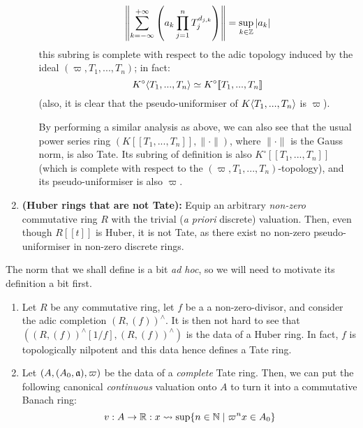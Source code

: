 \begin{example}
\begin{enumerate}
\begin{itemize}
                                    $$\left\|\sum_{k = -\infty}^{+\infty} \left(a_k \prod_{j = 1}^n T_j^{d_{j, k}}\right)\right\| = \sup_{k \in \mathbb{Z}} |a_k|$$
                                this subring is complete with respect to the adic topology induced by the ideal $(\varpi, T_1, ..., T_n)$; in fact:
                                    $$K^{\circ}\langle T_1, ..., T_n\rangle \simeq K^{\circ}[\![T_1, ..., T_n]\!]$$
                                (also, it is clear that the pseudo-uniformiser of $K\langle T_1, ..., T_n\rangle$ is $\varpi$).
                                
                                By performing a similar analysis as above, we can also see that the usual power series ring $(K[\![T_1, ..., T_n]\!], \|\cdot\|)$, where $\|\cdot\|$ is the Gauss norm, is also Tate. Its subring of definition is also $K^{\circ}[\![T_1, ..., T_n]\!]$ (which is complete with respect to the $(\varpi, T_1, ..., T_n)$-topology), and its pseudo-uniformiser is also $\varpi$.         
                            \end{itemize}
                        \item \textbf{(Huber rings that are not Tate):} Equip an arbitrary \textit{non-zero} commutative ring $R$ with the trivial (\textit{a priori} discrete) valuation. Then, even though $R[\![t]\!]$ is Huber, it is not Tate, as there exist no non-zero pseudo-uniformiser in non-zero discrete rings.  
                    \end{enumerate}
                \end{example}
                \begin{remark} \label{remark: canonical_norm_for_tate_rings}
                    The norm that we shall define is a bit \textit{ad hoc}, so we will need to motivate its definition a bit first.
                    \begin{enumerate}
                        \item Let $R$ be any commutative ring, let $f$ be a a non-zero-divisor, and consider the adic completion $(R, (f))^{\wedge}$. It is then not hard to see that $\left((R, (f))^{\wedge}[1/f], (R, (f))^{\wedge}\right)$ is the data of a Huber ring. In fact, $f$ is topologically nilpotent and this data hence defines a Tate ring. 
                        \item Let $(A, (A_0, \mathfrak{a}), \varpi)$ be the data of a \textit{complete} Tate ring. Then, we can put the following canonical \textit{continuous} valuation onto $A$ to turn it into a commutative Banach ring:
                            $$v: A \to \mathbb{R}: x \leadsto \sup\{n \in \mathbb{N} \mid \varpi^n x \in A_0\}$$
                    
                    \end{enumerate}
                \end{remark}
                
